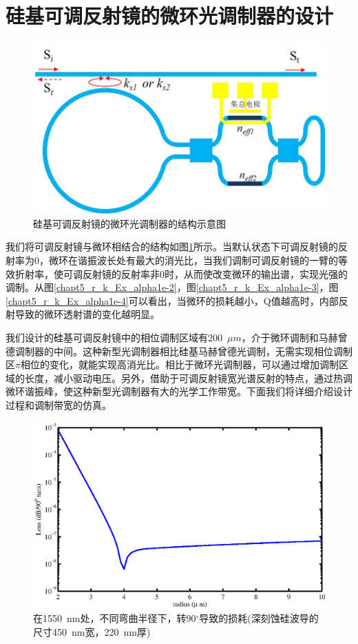 \section{硅基可调反射镜的微环光调制器的设计}
\begin{figure}[htb]
	\centering
	\includegraphics[width=12cm]{./Pictures/chapt5_tunable_reflection_ring_structure.jpg}
	\caption{硅基可调反射镜的微环光调制器的结构示意图}
	\label{chapt5_tunable_reflection_ring_structure}
\end{figure}
我们将可调反射镜与微环相结合的结构如图\ref{chapt5_tunable_reflection_ring_structure}所示。当默认状态下可调反射镜的反射率为0，微环在谐振波长处有最大的消光比，当我们调制可调反射镜的一臂的等效折射率，使可调反射镜的反射率非0时，从而使改变微环的输出谱，实现光强的调制。从图\ref{chapt5_r_k_Ex_alpha1e-2}，图\ref{chapt5_r_k_Ex_alpha1e-3}，图\ref{chapt5_r_k_Ex_alpha1e-4}可以看出，当微环的损耗越小，Q值越高时，内部反射导致的微环透射谱的变化越明显。

我们设计的硅基可调反射镜中的相位调制区域有200~$\mu m$，介于微环调制和马赫曾德调制器的中间。这种新型光调制器相比硅基马赫曾德光调制，无需实现相位调制区$\pi$相位的变化，就能实现高消光比。相比于微环光调制器，可以通过增加调制区域的长度，减小驱动电压。另外，借助于可调反射镜宽光谱反射的特点，通过热调微环谐振峰，使这种新型光调制器有大的光学工作带宽。下面我们将详细介绍设计过程和调制带宽的仿真。

\begin{figure}[htb]
	\centering
	\includegraphics[width=12cm]{./Pictures/chapt5_deep_si_bend_loss.eps}
	\caption{在1550~nm处，不同弯曲半径下，转90$^\circ$导致的损耗(深刻蚀硅波导的尺寸450~nm宽，220~nm厚)}
	\label{chapt5_deep_si_bend_loss}
\end{figure}

